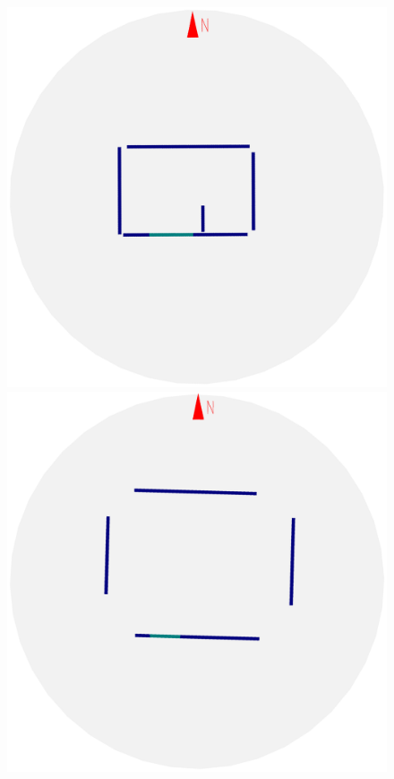 \begin{figure}[t]
\begin{center}
\begin{minipage}[b]{0.72\textwidth}
  \includegraphics[width=\figwidth]{f2_6_2D_walls_rotate}  %
  \includegraphics[width=\figwidth]{f2_7_2D_walls_rotate} %

\end{minipage}
\end{center}
\end{figure}
